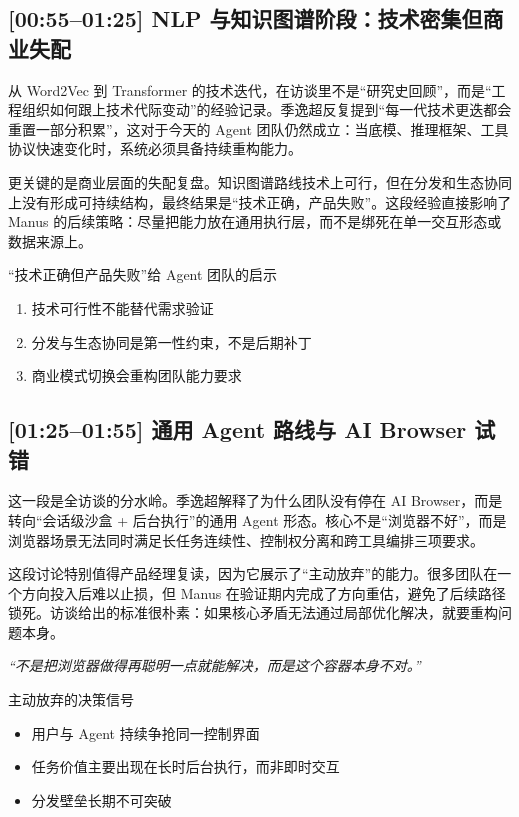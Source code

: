 \subsection{[00:55--01:25] NLP 与知识图谱阶段：技术密集但商业失配}

从 Word2Vec 到 Transformer 的技术迭代，在访谈里不是“研究史回顾”，而是“工程组织如何跟上技术代际变动”的经验记录。季逸超反复提到“每一代技术更迭都会重置一部分积累”，这对于今天的 Agent 团队仍然成立：当底模、推理框架、工具协议快速变化时，系统必须具备持续重构能力。

更关键的是商业层面的失配复盘。知识图谱路线技术上可行，但在分发和生态协同上没有形成可持续结构，最终结果是“技术正确，产品失败”。这段经验直接影响了 Manus 的后续策略：尽量把能力放在通用执行层，而不是绑死在单一交互形态或数据来源上。

\begin{importantbox}{“技术正确但产品失败”给 Agent 团队的启示}
\begin{enumerate}
    \item 技术可行性不能替代需求验证
    \item 分发与生态协同是第一性约束，不是后期补丁
    \item 商业模式切换会重构团队能力要求
\end{enumerate}
\end{importantbox}

\subsection{[01:25--01:55] 通用 Agent 路线与 AI Browser 试错}

这一段是全访谈的分水岭。季逸超解释了为什么团队没有停在 AI Browser，而是转向“会话级沙盒 + 后台执行”的通用 Agent 形态。核心不是“浏览器不好”，而是浏览器场景无法同时满足长任务连续性、控制权分离和跨工具编排三项要求。

这段讨论特别值得产品经理复读，因为它展示了“主动放弃”的能力。很多团队在一个方向投入后难以止损，但 Manus 在验证期内完成了方向重估，避免了后续路径锁死。访谈给出的标准很朴素：如果核心矛盾无法通过局部优化解决，就要重构问题本身。

\textit{``不是把浏览器做得再聪明一点就能解决，而是这个容器本身不对。''}

\begin{knowledgebox}{主动放弃的决策信号}
\begin{itemize}
    \item 用户与 Agent 持续争抢同一控制界面
    \item 任务价值主要出现在长时后台执行，而非即时交互
    \item 分发壁垒长期不可突破
\end{itemize}
\end{knowledgebox}

